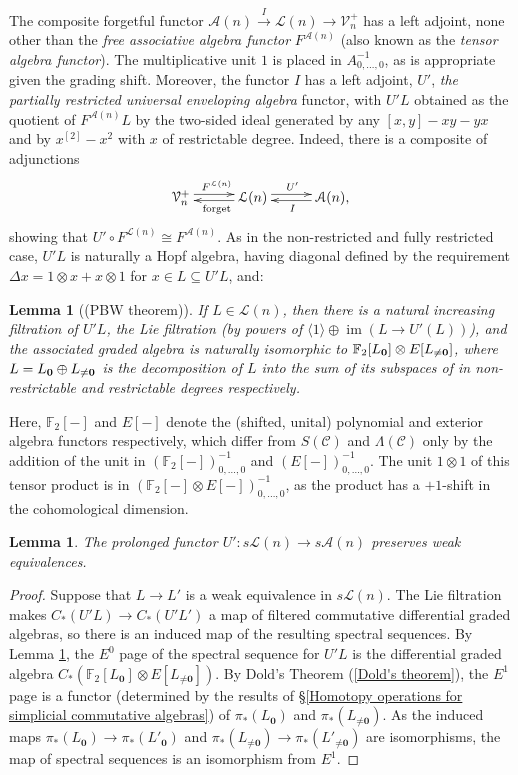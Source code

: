 \documentclass[11pt]{amsart} \renewcommand{\baselinestretch}{1.2}
\theoremstyle{plain}
\newtheorem{lem}[thm]{Lemma}
\theoremstyle{definition}
\DeclareMathOperator{\im}{im}
\newcommand{\DASH}{\mathrm{-}}
\renewcommand{\to}{\longrightarrow}
\newcommand{\scrC}{\mathscr{C}}
\newcommand{\calA}{\mathcal{A}}
\newcommand{\calL}{\mathcal{L}}
\newcommand{\calV}{\mathcal{V}}
\newcommand{\CommOperad}{{\scrC}}
\newcommand{\restn}[1]{#1^{[2]}}
\newcommand{\vect}[2]{\calV^{#1}_{#2}}
\newcommand{\UEA}{U'}%
\newcommand{\F}{\mathbb{F}}
\newcommand{\Ftwo}{\F_2}
\begin{document}
\begin{appendices}
The composite forgetful functor $\calA(n)\overset{I}{\to}\calL(n)\to\vect{+}{n}$ has a left adjoint, none other than the \emph{free associative algebra functor} $F^{\calA(n)}$ (also known as the \emph{tensor algebra functor}). The multiplicative unit $1$ is placed in $A^{-1}_{0,\ldots,0}$, as is appropriate given the grading shift. Moreover, the functor $I$ has a left adjoint, $\UEA$, \emph{the partially restricted universal enveloping algebra} functor, with $\UEA L$ obtained as the quotient of $F^{\calA(n)}L$ by the two-sided ideal generated by any $[x,y]-xy-yx$ and by $\restn{x}-x^2$ with $x$ of restrictable degree. Indeed, there is a composite of adjunctions
\[\xymatrix@R=.3cm@C=1cm{
\vect{+}{n}  \ar@<.6ex>[r]^{F^{\calL(n)}}&
\calL(n)  \ar@<.4ex>[l]^{\textup{forget}} \ar@<.6ex>[r]^{\UEA}&
\calA(n),  \ar@<.4ex>[l]^{I} 
}
\]
showing that $\UEA\circ F^{\calL(n)}\cong F^{\calA(n)}$. As in the non-restricted and fully restricted case, $\UEA L$ is naturally a Hopf algebra, having diagonal defined by the requirement $\Delta x=1\otimes x+x\otimes 1$ for $x\in L\subseteq \UEA L$, and:
\begin{lem}[(PBW theorem)]\label{Partially restricted PBW Theorem}
If $L\in\calL(n)$, then there is a natural increasing filtration of $\UEA L$, the Lie filtration (by powers of $\langle 1\rangle\oplus \im(L\to \UEA(L))$), and the associated graded algebra is naturally isomorphic to $\Ftwo [L_{\textup{\textbf{0}}}]\otimes E[L_{\neq\textup{\textbf{0}}}]$, where $L=L_{\textbf{\textup{0}}}\oplus L_{\neq\textbf{\textup{0}}}$ is the decomposition of $L$ into the sum of its subspaces of in non-restrictable and restrictable degrees respectively.
\end{lem}
Here, $\Ftwo [\DASH]$ and $E[\DASH]$ denote the (shifted, unital) polynomial and exterior algebra functors respectively, which differ from $S(\CommOperad)$ and $\Lambda(\CommOperad)$ only by the addition of the unit in $(\Ftwo [\DASH])^{-1}_{0,\ldots,0}$ and $(E[\DASH])^{-1}_{0,\ldots,0}$. The unit $1\otimes1 $ of this tensor product is in $(\Ftwo [\DASH]\otimes E[\DASH])^{-1}_{0,\ldots,0}$, as the product has a $+1$-shift in the cohomological dimension.
\begin{lem}
The prolonged functor $\UEA:s\calL(n)\to s\calA(n)$ preserves weak equivalences.
\end{lem}
\begin{proof}
Suppose that $L\to L'$ is a weak equivalence in $s\calL(n)$. The Lie filtration makes $C_*(\UEA L)\to C_*(\UEA L')$ a map of filtered commutative differential graded algebras, so there is an induced map of the resulting spectral sequences. By Lemma \ref{Partially restricted PBW Theorem}, the $E^0$ page of the spectral sequence for $\UEA L$ is the differential graded algebra $C_*(\Ftwo [L_{\textbf{0}}]\otimes E[L_{\neq\textbf{0}}])$. By Dold's Theorem (\ref{Dold's theorem}), the $E^1$ page is a functor (determined by the results of \S\ref{Homotopy operations for simplicial commutative algebras}) of $\pi_*(L_{\textbf{0}})$ and $\pi_*(L_{\neq\textbf{0}})$. As the induced maps $\pi_*(L_{\textbf{0}})\to\pi_*(L'_{\textbf{0}})$ and $\pi_*(L_{\neq\textbf{0}})\to\pi_*(L'_{\neq\textbf{0}})$ are isomorphisms, the map of spectral sequences is an isomorphism from $E^1$.

\end{proof}
\end{appendices}
\end{document}
